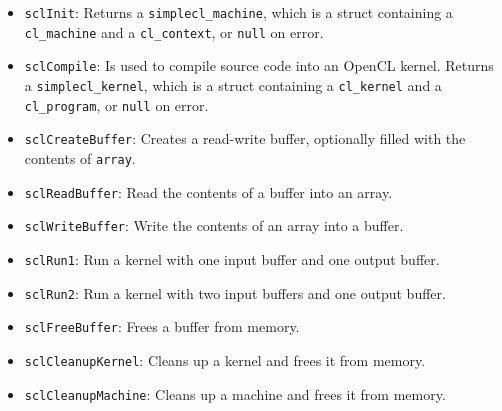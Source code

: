 \begin{itemize}
  \item \texttt{sclInit}: Returns a \texttt{simplecl\_machine},
    which is a struct containing a \texttt{cl\_machine} and a
    \texttt{cl\_context}, or \texttt{null} on error.
  \item \texttt{sclCompile}: Is used to compile source code into
    an OpenCL kernel. Returns a \texttt{simplecl\_kernel}, which is a
    struct containing a \texttt{cl\_kernel} and a
    \texttt{cl\_program}, or \texttt{null} on error.
  \item \texttt{sclCreateBuffer}: Creates a read-write buffer,
    optionally filled with the contents of \texttt{array}.
  \item \texttt{sclReadBuffer}: Read the contents of a buffer into an
    array.
  \item \texttt{sclWriteBuffer}: Write the contents of an array into a
    buffer.
  \item \texttt{sclRun1}: Run a kernel with one input buffer and one
    output buffer.
  \item \texttt{sclRun2}: Run a kernel with two input buffers and one
    output buffer.
  \item \texttt{sclFreeBuffer}: Frees a buffer from memory.
  \item \texttt{sclCleanupKernel}: Cleans up a kernel and frees it
    from memory.
  \item \texttt{sclCleanupMachine}: Cleans up a machine and frees it
    from memory.
\end{itemize}
